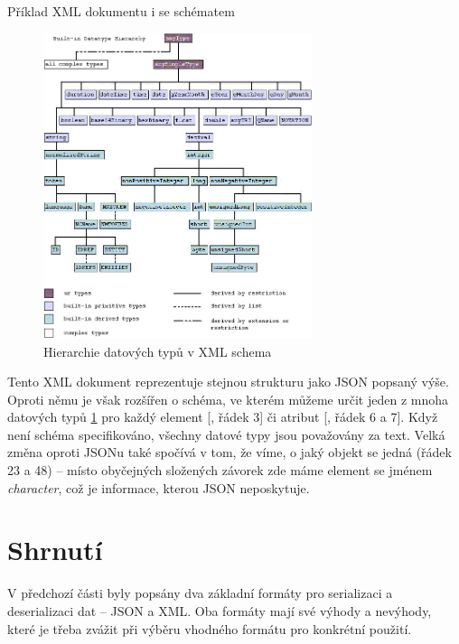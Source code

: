 \begin{listing}[ht!]
    \inputminted{xml}{resources/code/standards/player.xml}
    \caption{Příklad XML dokumentu i se schématem}
    \label{code:xml_player}
\end{listing}

\begin{figure}[ht!]
    \centering
    \includegraphics[width=0.7\textwidth]{figures/type-hierarchy.png}
    \caption{Hierarchie datových typů v XML schema \cite[]{w3XMLSchemaBuiltIn}}
    \label{fig:xml_datatypes}
\end{figure}

Tento XML dokument  reprezentuje stejnou strukturu jako JSON popsaný výše. Oproti němu je však rozšířen o schéma, ve kterém můžeme určit jeden z mnoha datových typů \ref{fig:xml_datatypes} pro každý element [, řádek 3] či atribut [, řádek 6 a 7]. Když není schéma specifikováno, všechny datové typy jsou považovány za text. Velká změna oproti JSONu také spočívá v tom, že víme, o jaký objekt se jedná (řádek 23 a 48) -- místo obyčejných složených závorek zde máme element se jménem \textit{character}, což je informace, kterou JSON neposkytuje.


\section{Shrnutí}\label{sec:formats:conclusion}
V předchozí části byly popsány dva základní formáty pro serializaci a deserializaci dat -- JSON a XML. Oba formáty mají své výhody a nevýhody, které je třeba zvážit při výběru vhodného formátu pro konkrétní použití.

